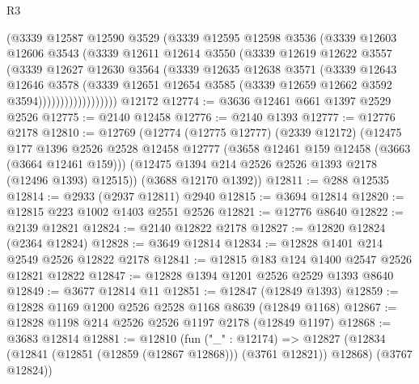 \begin{lexlean}{R3}
\begin{coremodule}
                    (@3339
                      @12587
                      @12590
                      @3529
                      (@3339
                        @12595
                        @12598
                        @3536
                        (@3339
                          @12603
                          @12606
                          @3543
                          (@3339
                            @12611
                            @12614
                            @3550
                            (@3339
                              @12619
                              @12622
                              @3557
                              (@3339
                                @12627
                                @12630
                                @3564
                                (@3339
                                  @12635
                                  @12638
                                  @3571
                                  (@3339
                                    @12643
                                    @12646
                                    @3578
                                    (@3339
                                      @12651
                                      @12654
                                      @3585
                                      (@3339 @12659 @12662 @3592 @3594))))))))))))))))))
    @12172
@12774 := @3636 @12461 @661 @1397 @2529 @2526
@12775 := @2140 @12458
@12776 := @2140 @1393
@12777 := @12776 @2178
@12810 := @12769
    (@12774
      (@12775 @12777)
      (@2339 @12172)
      (@12475
        @177
        @1396
        @2526
        @2528
        @12458
        @12777
        (@3658 @12461 @159 @12458 (@3663 (@3664 @12461 @159)))
        (@12475 @1394 @214 @2526 @2526 @1393 @2178 (@12496 @1393) @12515))
      (@3688 @12170 @1392))
@12811 := @288 @12535
@12814 := @2933 (@2937 @12811) @2940
@12815 := @3694 @12814
@12820 := @12815 @223 @1002 @1403 @2551 @2526
@12821 := @12776 @8640
@12822 := @2139 @12821
@12824 := @2140 @12822 @2178
@12827 := @12820 @12824 (@2364 @12824)
@12828 := @3649 @12814
@12834 := @12828 @1401 @214 @2549 @2526 @12822 @2178
@12841 := @12815 @183 @124 @1400 @2547 @2526 @12821 @12822
@12847 := @12828 @1394 @1201 @2526 @2529 @1393 @8640
@12849 := @3677 @12814 @11
@12851 := @12847 (@12849 @1393)
@12859 := @12828 @1169 @1200 @2526 @2528 @1168 @8639 (@12849 @1168)
@12867 := @12828 @1198 @214 @2526 @2526 @1197 @2178 (@12849 @1197)
@12868 := @3683 @12814
@12881 := @12810
    (fun ("_" : @12174) =>
    @12827 (@12834 (@12841 (@12851 (@12859 (@12867 @12868))) (@3761 @12821)) @12868) (@3767 @12824))

\end{coremodule}
\end{lexlean}
